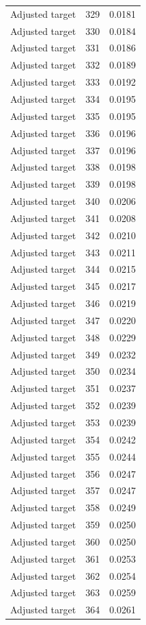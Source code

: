\begin{table}[htbp]
\begin{tabular}{lll}
Adjusted target & 329 & 0.0181 \\
Adjusted target & 330 & 0.0184 \\
Adjusted target & 331 & 0.0186 \\
Adjusted target & 332 & 0.0189 \\
Adjusted target & 333 & 0.0192 \\
Adjusted target & 334 & 0.0195 \\
Adjusted target & 335 & 0.0195 \\
Adjusted target & 336 & 0.0196 \\
Adjusted target & 337 & 0.0196 \\
Adjusted target & 338 & 0.0198 \\
Adjusted target & 339 & 0.0198 \\
Adjusted target & 340 & 0.0206 \\
Adjusted target & 341 & 0.0208 \\
Adjusted target & 342 & 0.0210 \\
Adjusted target & 343 & 0.0211 \\
Adjusted target & 344 & 0.0215 \\
Adjusted target & 345 & 0.0217 \\
Adjusted target & 346 & 0.0219 \\
Adjusted target & 347 & 0.0220 \\
Adjusted target & 348 & 0.0229 \\
Adjusted target & 349 & 0.0232 \\
Adjusted target & 350 & 0.0234 \\
Adjusted target & 351 & 0.0237 \\
Adjusted target & 352 & 0.0239 \\
Adjusted target & 353 & 0.0239 \\
Adjusted target & 354 & 0.0242 \\
Adjusted target & 355 & 0.0244 \\
Adjusted target & 356 & 0.0247 \\
Adjusted target & 357 & 0.0247 \\
Adjusted target & 358 & 0.0249 \\
Adjusted target & 359 & 0.0250 \\
Adjusted target & 360 & 0.0250 \\
Adjusted target & 361 & 0.0253 \\
Adjusted target & 362 & 0.0254 \\
Adjusted target & 363 & 0.0259 \\
Adjusted target & 364 & 0.0261 \\

\end{tabular}
\end{table}
